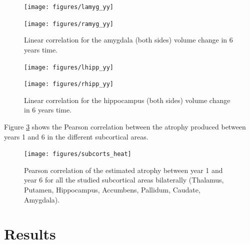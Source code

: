 \documentclass[11pt]{article}
\theoremstyle{definition}
\theoremstyle{remark}
\begin{document}
\begin{figure}[!htb]
    \centering
    \begin{minipage}{.45\textwidth}
        \centering
        \texttt{[image: figures/lamyg\_yy]} %
    \end{minipage}%
    \hfill
    \begin{minipage}{0.45\textwidth}
        \centering
        \texttt{[image: figures/ramyg\_yy]}
    \end{minipage}
    \caption{Linear correlation for the amygdala (both sides) volume change in 6 years time.}
    \label{fig:amygyy}
\end{figure}

\begin{figure}[!htb]
    \centering
    \begin{minipage}{.45\textwidth}
        \centering
        \texttt{[image: figures/lhipp\_yy]} %
    \end{minipage}%
    \hfill
    \begin{minipage}{0.45\textwidth}
        \centering
        \texttt{[image: figures/rhipp\_yy]}
    \end{minipage}
    \caption{Linear correlation for the hippocampus (both sides) volume change in 6 years time.}
    \label{fig:hippyy}
\end{figure}

\newpage
Figure \ref{fig:subyypearson} shows the Pearson correlation between the atrophy produced between years 1 and 6 in the different subcortical areas. 
\begin{figure}[!htb]
        \centering
        \texttt{[image: figures/subcorts\_heat]}
        \caption{Pearson correlation of the estimated atrophy between year 1 and year 6 for all the studied subcortical areas bilaterally (Thalamus, Putamen, Hippocampus, Accumbens, Pallidum, Caudate, Amygdala).} 
        \label{fig:subyypearson}
\end{figure}

\newpage
\newpage
\newpage
\section{Results}
\label{se:res}
\end{document}
